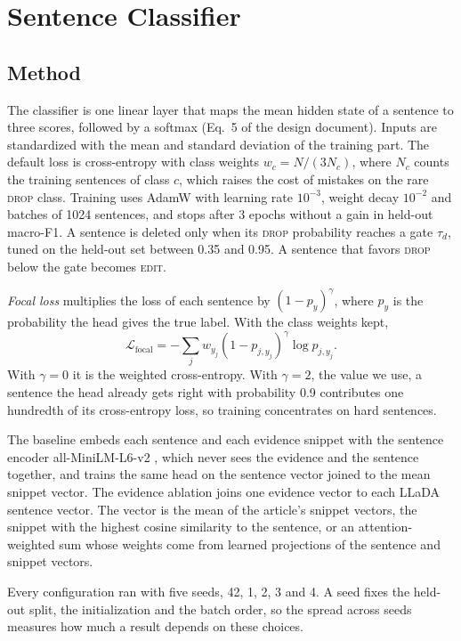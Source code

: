 \documentclass[]{paper}
\newcommand{\edit}{\textsc{edit}}
\newcommand{\drop}{\textsc{drop}}
\begin{document}
\section{Sentence Classifier}
\label{sec:classifier}

\subsection{Method}

The classifier is one linear layer that maps the mean hidden state of a sentence to three scores, followed by a softmax (Eq.~5 of the design document). Inputs are standardized with the mean and standard deviation of the training part. The default loss is cross-entropy with class weights $w_c = N / (3 N_c)$, where $N_c$ counts the training sentences of class $c$, which raises the cost of mistakes on the rare \drop{} class. Training uses AdamW with learning rate $10^{-3}$, weight decay $10^{-2}$ and batches of 1024 sentences, and stops after 3 epochs without a gain in held-out macro-F1. A sentence is deleted only when its \drop{} probability reaches a gate $\tau_d$, tuned on the held-out set between 0.35 and 0.95. A sentence that favors \drop{} below the gate becomes \edit{}.

\emph{Focal loss} \citep{lin-etal-2017-focal} multiplies the loss of each sentence by $(1 - p_y)^\gamma$, where $p_y$ is the probability the head gives the true label. With the class weights kept,
\[
\mathcal{L}_{\text{focal}} = -\sum_j w_{y_j} (1 - p_{j, y_j})^{\gamma} \log p_{j, y_j}.
\]
With $\gamma = 0$ it is the weighted cross-entropy. With $\gamma = 2$, the value we use, a sentence the head already gets right with probability 0.9 contributes one hundredth of its cross-entropy loss, so training concentrates on hard sentences.

The baseline embeds each sentence and each evidence snippet with the sentence encoder all-MiniLM-L6-v2 \citep{wang-etal-2020-minilm, reimers-gurevych-2019-sentence}, which never sees the evidence and the sentence together, and trains the same head on the sentence vector joined to the mean snippet vector. The evidence ablation joins one evidence vector to each LLaDA sentence vector. The vector is the mean of the article's snippet vectors, the snippet with the highest cosine similarity to the sentence, or an attention-weighted sum whose weights come from learned projections of the sentence and snippet vectors.

Every configuration ran with five seeds, 42, 1, 2, 3 and 4. A seed fixes the held-out split, the initialization and the batch order, so the spread across seeds measures how much a result depends on these choices.
\end{document}
